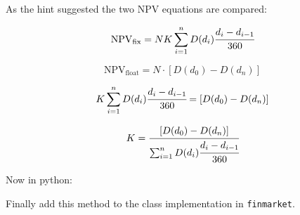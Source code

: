 \begin{Answer}
As the hint suggested the two NPV equations are compared:

\[\mathrm{NPV}_{\mathrm{fix}} = NK \sum_{i=1}^{n}D(d_{i})\cfrac{d_i - d_{i-1}}{360}\]

\[\mathrm{NPV}_{\mathrm{float}} = N \cdot [D(d_0) - D(d_n)]\]

\[K \sum_{i=1}^{n}D(d_{i})\cfrac{d_i - d_{i-1}}{360} = [D(d_0) - D(d_n)]\]

\[K = \cfrac{[D(d_0) - D(d_n)]}{\sum_{i=1}^{n}D(d_{i})\cfrac{d_i - d_{i-1}}{360}}\]

Now in python:

\begin{Shaded}
\begin{Highlighting}[]
\OperatorTok{=} 
         \NormalTok{(}\NormalTok{, }\NormalTok{(}
\OperatorTok{=} \NormalTok{.payment_dates[i}\NormalTok{] }
\OperatorTok{=} 
\OperatorTok{=}\OperatorTok{-}\OperatorTok{/} 
\OperatorTok{=}
\OperatorTok{+=}\OperatorTok{*}
\OperatorTok{=}\NormalTok{.payment_dates[}\NormalTok{]) }\OperatorTok{-} 
\NormalTok{.payment_dates[}\OperatorTok{-}\NormalTok{]))}

        \OperatorTok{/}
\end{Highlighting}
\end{Shaded}

Finally add this method to the class implementation in \texttt{finmarket}.
\end{Answer}
